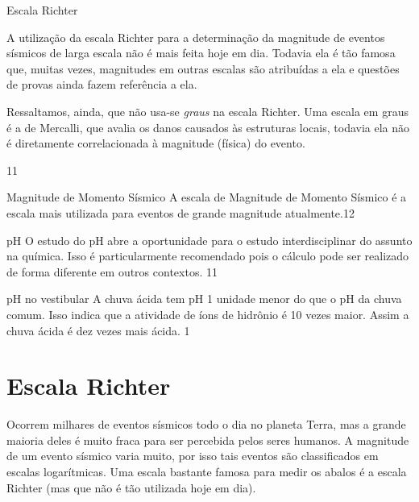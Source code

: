 \cleardoublepage
\def\currentcolor{session1}
\begin{sugestions}{Escala Richter}
{A utilização da escala Richter para a determinação da magnitude de  eventos sísmicos de larga escala não é mais feita hoje em dia. Todavia ela é tão famosa que, muitas vezes, magnitudes em outras escalas são atribuídas a ela e questões de provas ainda fazem referência a ela.

Ressaltamos, ainda, que não usa-se \textit{graus} na escala Richter. Uma escala em graus é a de Mercalli, que avalia os danos causados às estruturas locais, todavia ela não é diretamente correlacionada à magnitude (física) do evento.}{1}{1}
\end{sugestions}
\clearmargin
\begin{sugestions}{Magnitude de Momento Sísmico}
{A escala de Magnitude de Momento Sísmico é a escala mais utilizada para eventos de grande magnitude atualmente.}{1}{2}
\end{sugestions}
\clearmargin

\begin{sugestions}{pH}
{
	O estudo do pH abre a oportunidade para o estudo interdisciplinar do assunto na química. Isso é particularmente recomendado pois o cálculo pode ser realizado de forma diferente em outros contextos.
}{1}{1}
\end{sugestions}
\begin{answer}{pH no vestibular}
{
	A chuva ácida tem pH 1 unidade menor do que o pH da chuva comum. Isso indica que a atividade de íons de hidrônio é 10 vezes maior. Assim a chuva ácida é dez vezes mais ácida.
}{1}
\end{answer}


\section{Escala Richter}

Ocorrem milhares de eventos sísmicos todo o dia no planeta Terra, mas a grande maioria deles é muito fraca para ser percebida pelos seres humanos. A magnitude de um evento sísmico varia muito, por isso tais eventos são classificados em escalas logarítmicas. Uma escala bastante famosa para medir os abalos é a escala Richter (mas que não é tão utilizada hoje em dia).

